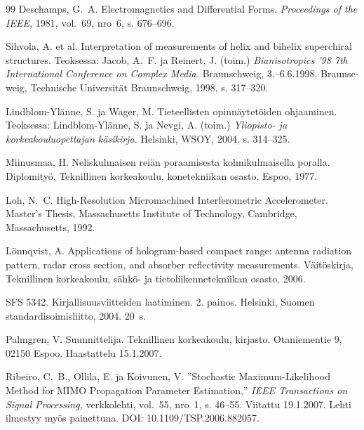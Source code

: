 \documentclass[finnish, 12pt, a4paper, arts, utf8, a-2b, online]{aaltothesis}
\begin{document}
\begin{thebibliography}{99}
 Deschamps, G.\ A. \foreignlanguage{english}{
	Electromagnetics and Differential Forms. \textit{Proceedings of the IEEE,}} 
	1981, vol.~69, nro~6, s. 676--696.

 Sihvola, A. et al.
	\foreignlanguage{english}{Interpretation of measurements of helix and bihelix 
		superchiral structures.}
Teoksessa: Jacob, A.\ F. ja	Reinert, J. (toim.)
\foreignlanguage{english}{\textit{Bianisotropics '98 7th International 
		Conference on Complex Media.}}
\foreignlanguage{german}{Braunschweig, 3.--6.6.1998. Braunscweig, Technische 
	Universität Braunschweig,} 1998, s. 317--320.

 Lindblom-Ylänne, S. ja Wager, M.
   Tieteellisten opinnäytetöiden ohjaaminen.
   Teoksessa: Lindblom-Ylänne, S. ja Nevgi, A. (toim.)
   \textit{Yliopisto- ja korkeakouluopettajan käsikirja.}
   Helsinki, WSOY, 2004, s. 314--325.

 Miinusmaa, H. Neliskulmaisen reiän poraamisesta
   kolmikulmaisella poralla. Diplomityö, Teknillinen korkeakoulu,
   konetekniikan osasto, Espoo, 1977.

 Loh, N.\ C. \foreignlanguage{english}{High-Resolution 
	Micromachined Interferometric Accelerometer. Master's Thesis, 
	Massachusetts Institute of Technology, Cambridge, Massachusetts,} 1992.

 Lönnqvist, A.
   \foreignlanguage{english}{Applications of hologram-based compact range:
	antenna radiation pattern, radar cross section, and absorber reflectivity 
	measurements.}
	Väitöskirja, Teknillinen korkeakoulu, sähkö- ja tietoliikennetekniikan
	osasto, 2006.
	
 SFS 5342. Kirjallisuusviitteiden laatiminen. 2. painos.
   Helsinki, Suomen standardisoimisliitto, 2004. 20~s.

 Palmgren, V. Suunnittelija. Teknillinen korkeakoulu,
   kirjasto. Otaniementie 9, 02150 Espoo. Haastattelu 15.1.2007.

 Ribeiro, C.\ B., Ollila, E. ja Koivunen, V.
   \foreignlanguage{english}{''Stochastic Maximum-Likelihood Method for MIMO
	Propagation Parameter Estimation,''}
	\textit{IEEE Transactions on Signal Processing,} verkkolehti, vol.~55,
	nro~1, s. 46--55. Viitattu 19.1.2007. Lehti ilmestyy myös painettuna. 
	DOI: 10.1109/TSP.2006.882057.


\end{thebibliography}
\end{document}
